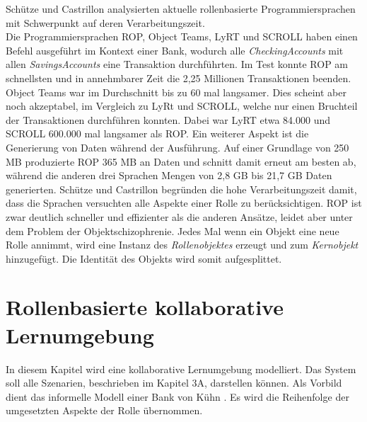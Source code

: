 \documentclass[conference]{IEEEtran}
\begin{document}
Schütze und Castrillon analysierten aktuelle rollenbasierte Programmiersprachen mit Schwerpunkt auf deren Verarbeitungszeit\cite{schutze2017analyzing}.\\ Die Programmiersprachen ROP, Object Teams, LyRT und SCROLL haben einen Befehl ausgeführt im Kontext einer Bank, wodurch alle \textit{CheckingAccounts} mit allen \textit{SavingsAccounts} eine Transaktion durchführten. Im Test konnte ROP am schnellsten und in annehmbarer Zeit die 2,25 Millionen Transaktionen beenden. Object Teams war im Durchschnitt bis zu 60 mal langsamer. Dies scheint aber noch akzeptabel, im Vergleich zu LyRt und SCROLL, welche nur einen Bruchteil der Transaktionen durchführen konnten. Dabei war LyRT etwa 84.000 und SCROLL 600.000 mal langsamer als ROP. Ein weiterer Aspekt ist die Generierung von Daten während der Ausführung. Auf einer Grundlage von 250 MB produzierte ROP 365 MB an Daten und schnitt damit erneut am besten ab, während die anderen drei Sprachen Mengen von 2,8 GB bis 21,7 GB Daten generierten. Schütze und Castrillon begründen die hohe Verarbeitungszeit damit, dass die Sprachen versuchten alle Aspekte einer Rolle zu berücksichtigen. ROP ist zwar deutlich schneller und effizienter als die anderen Ansätze, leidet aber unter dem Problem der Objektschizophrenie. Jedes Mal wenn ein Objekt eine neue Rolle annimmt, wird eine Instanz des \textit{Rollenobjektes} erzeugt und zum \textit{Kernobjekt} hinzugefügt. Die Identität des Objekts wird somit aufgesplittet.

\section{Rollenbasierte kollaborative Lernumgebung}
In diesem Kapitel wird eine kollaborative Lernumgebung modelliert. Das System soll alle Szenarien, beschrieben im Kapitel 3A, darstellen können. Als Vorbild dient das informelle Modell einer Bank von Kühn \cite{family}. Es wird die Reihenfolge der umgesetzten Aspekte der Rolle übernommen. 
\end{document}
